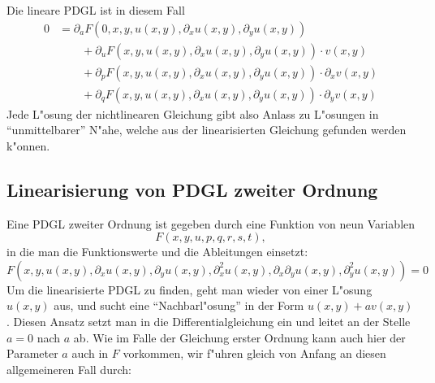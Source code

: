 Die lineare PDGL ist in diesem Fall
\begin{align*}
0
&=
\partial_aF(0,x,y,u(x,y),\partial_xu(x,y),\partial_yu(x,y))
\\
&\qquad
+
\partial_uF(x,y,u(x,y),\partial_xu(x,y),\partial_yu(x,y))\cdot v(x,y)
\\
&\qquad
+
\partial_pF(x,y,u(x,y),\partial_xu(x,y),\partial_yu(x,y))\cdot \partial_xv(x,y)
\\
&\qquad
+
\partial_qF(x,y,u(x,y),\partial_xu(x,y),\partial_yu(x,y))\cdot \partial_yv(x,y)
\end{align*}
Jede L"osung der nichtlinearen Gleichung gibt also Anlass zu L"osungen
in ``unmittelbarer'' N"ahe, welche aus der linearisierten Gleichung
gefunden werden k"onnen.

\subsection{Linearisierung von PDGL zweiter Ordnung}
Eine PDGL zweiter Ordnung ist gegeben durch eine Funktion von neun
Variablen
$$F(x,y,u,p,q,r,s,t),$$
in die man die Funktionswerte und die Ableitungen einsetzt:
$$
F(x,y,u(x,y), \partial_xu(x,y),\partial_yu(x,y),
\partial_x^2u(x,y),
\partial_x\partial_yu(x,y),
\partial_y^2u(x,y))
=0$$
Um die linearisierte PDGL zu finden, geht man wieder von einer
L"osung $u(x,y)$ aus, und sucht eine ``Nachbarl"osung'' in der
Form $u(x,y)+av(x,y)$. Diesen Ansatz setzt man in die 
Differentialgleichung ein und leitet an der Stelle $a=0$
nach $a$ ab. Wie im Falle der Gleichung erster Ordnung kann auch
hier der Parameter $a$ auch in $F$ vorkommen, wir f"uhren gleich
von Anfang an diesen allgemeineren Fall  durch:
